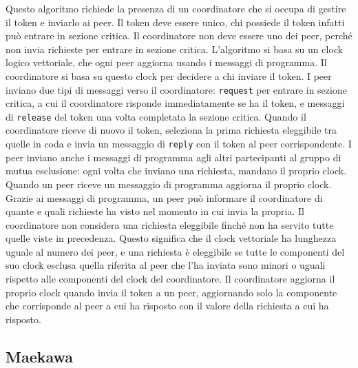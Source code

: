 \documentclass[conference]{IEEEtran}
\begin{document}
Questo algoritmo richiede la presenza di un coordinatore che si occupa di gestire il token e inviarlo ai peer. Il token deve essere unico, chi possiede il token infatti può entrare in sezione critica. Il coordinatore non deve essere uno dei peer, perché non invia richieste per entrare in sezione critica. L'algoritmo si basa su un clock logico vettoriale, che ogni peer aggiorna usando i messaggi di programma. Il coordinatore si basa su questo clock per decidere a chi inviare il token. I peer inviano due tipi di messaggi verso il coordinatore: \verb|request| per entrare in sezione critica, a cui il coordinatore risponde immediatamente se ha il token, e messaggi di \verb|release| del token una volta completata la sezione critica. Quando il coordinatore riceve di nuovo il token, seleziona la prima richiesta eleggibile tra quelle in coda e invia un messaggio di \verb|reply| con il token al peer corrispondente. I peer inviano anche i messaggi di programma agli altri partecipanti al gruppo di mutua esclusione: ogni volta che inviano una richiesta, mandano il proprio clock. Quando un peer riceve un messaggio di programma aggiorna il proprio clock. Grazie ai messaggi di programma, un peer può informare il coordinatore di quante e quali richieste ha visto nel momento in cui invia la propria. Il coordinatore non considera una richiesta eleggibile finché non ha servito tutte quelle viste in precedenza. Questo significa che il clock vettoriale ha lunghezza uguale al numero dei peer, e una richiesta è eleggibile se tutte le componenti del suo clock esclusa quella riferita al peer che l'ha inviata sono minori o uguali rispetto alle componenti del clock del coordinatore. Il coordinatore aggiorna il proprio clock quando invia il token a un peer, aggiornando solo la componente che corrisponde al peer a cui ha risposto con il valore della richiesta a cui ha risposto.

\subsection{Maekawa}
\end{document}
